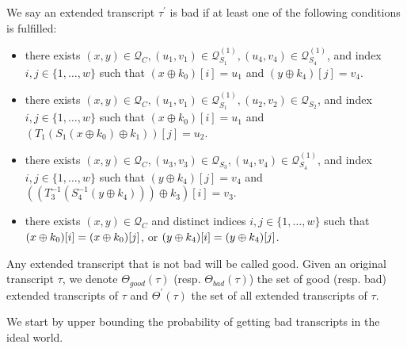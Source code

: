 \begin{definition}
\label{defn:bad-tau-4-rounds}

We say an extended transcript $\tau^{\prime}$ is bad if at least one of the following conditions is fulfilled:
\begin{itemize}
	\item[\bone]
	there exists $(x, y) \in \mathcal{Q}_{C}, \left(u_{1}, v_{1}\right) \in \mathcal{Q}_{S_{1}}^{(1)}, \left(u_{4}, v_{4}\right) \in \mathcal{Q}_{S_{4}}^{(1)}$, and index $i, j \in \{1, \ldots, w\}$ such that $\left(x \oplus k_{0}\right)[i]=u_1$ and $\left(y \oplus k_{4}\right)[j]=v_4$.
	\item[\btwo]
	there exists $(x,y) \in \mathcal{Q}_{C}, \left(u_{1}, v_{1}\right) \in \mathcal{Q}_{S_{1}}^{(1)}, \left(u_{2}, v_{2}\right) \in \mathcal{Q}_{S_{2}}$, and index $i, j \in \{1, \ldots, w\}$ such that $\left(x \oplus k_{0}\right)[i]=u_1$ and $\left(T_{1}\left(S_{1}\left(x \oplus k_{0}\right) \oplus k_{1}\right)\right)[j]=u_2$.
	\item[\bthree]
	there exists $(x,y) \in \mathcal{Q}_{C}, \left(u_{3}, v_{3}\right) \in \mathcal{Q}_{S_{3}}, \left(u_{4}, v_{4}\right) \in \mathcal{Q}_{S_{4}}^{(1)}$, and index $i, j \in \{1, \ldots, w\}$ such that $\left(y \oplus k_{4}\right)[j]=v_4$ and $\left(\left(T_{3}^{-1}\left(S_{4}^{-1}\left(y \oplus k_{4}\right)\right)\right) \oplus k_{3}\right)[i]=v_3$.
	\item[\bfour]
	there exists $(x,y) \in \mathcal{Q}_{C}$ and distinct indices $i, j \in \{1, \ldots, w\}$ such that $(x\oplus k_0)[i]=(x\oplus k_0)[j]$, or $(y\oplus k_4)[i]=(y\oplus k_4)[j]$.
\end{itemize}
Any extended transcript that is not bad will be called good. Given an original transcript $\tau$, we denote $\Theta_{good}(\tau)$ (resp. $\Theta_{bad}(\tau)$) the set of good (resp. bad) extended transcripts of $\tau$ and $\Theta^{'}(\tau)$ the set of all extended transcripts of $\tau$.
\end{definition}



We start by upper bounding the probability of getting bad transcripts in the ideal world.

